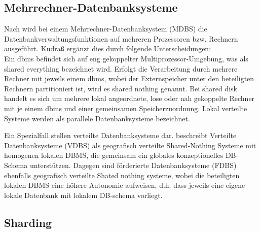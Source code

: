 \subsection{Mehrrechner-Datenbanksysteme}
Nach \cite[S.394]{book:kudrass} wird bei einem Mehrrechner-Datenbanksystem (MDBS) die Datenbankverwaltungsfunktionen auf mehreren Prozessoren bzw. Rechnern ausgeführt.
Kudraß ergänzt dies durch folgende Unterscheidungen:\\
Ein \Gls{dbms} befindet sich auf eng gekoppelter Multiprozessor-Umgebung, was als shared everything bezeichnet wird.
Erfolgt die Verarbeitung durch mehrere Rechner mit jeweils einem \Gls{dbms}, wobei der Externspeicher unter den beteiligten Rechnern partitioniert ist, wird es shared nothing genannt.
Bei shared disk handelt es sich um mehrere lokal angeordnete, lose oder nah gekoppelte Rechner mit je einem \Gls{dbms} und einer gemeinsamen Speicherzuordnung.
Lokal verteilte Systeme werden als parallele Datenbanksysteme bezeichnet.

Ein Spezialfall stellen verteilte Datenbanksysteme dar.
\cite[S.398]{book:kudrass} beschreibt Verteilte Datenbanksysteme (VDBS) als geografisch verteilte Shared-Nothing Systeme mit homogenen lokalen DBMS, die gemeinsam ein globales konzeptionelles DB-Schema unterstützen.
Dagegen sind förderierte Datenbanksysteme (FDBS) ebenfalls geografisch verteilte Shated nothing systeme, wobei die beteiligten lokalen DBMS eine höhere Autonomie aufweisen, d.h. dass jeweils eine eigene lokale Datenbank mit lokalem DB-schema vorliegt.

%
%
%

\subsection{Sharding}

